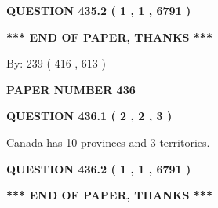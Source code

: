 \documentclass[12pt]{article}
\begin{document}
{\textbf{\Large{QUESTION
435.2 
 ( 1 , 1 , 6791 )
}}}
  
  
   
   
 \vspace{0.2in}
 
   
   
   
   
\vspace{1.0in} 
{\textbf{\large{ *** END OF PAPER, THANKS *** }}} 
   
   
\hspace{1.0in} By: 
 239 ( 416 ,  613 )
   
   
   
   
\newpage 
\setcounter{page}{ 
   436001 } 
   
   
   
   
 {\textbf{ \Large{ PAPER NUMBER  436  }}}
   
   
\vspace{0.2in}
   
   
   
   
   
   
 \vspace{0.2in}
 
 
 
 
   
   
  
\vspace{0.2in}
  
{\textbf{\Large{QUESTION
436.1 
 ( 2 , 2 , 3 )
}}}
  
  
 
 
\noindent{}
 
 
Canada has 10  provinces and 3 territories.
 
 
 
 
  
\vspace{0.2in}
  
{\textbf{\Large{QUESTION
436.2 
 ( 1 , 1 , 6791 )
}}}
  
  
   
   
 \vspace{0.2in}
 
   
   
   
   
\vspace{1.0in} 
{\textbf{\large{ *** END OF PAPER, THANKS *** }}} 
   
\end{document}
